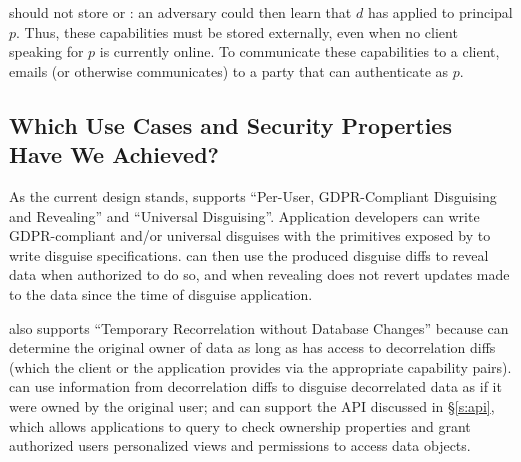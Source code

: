 \sys should not store  or : an adversary could then
learn that $d$ has applied to principal $p$. Thus, these capabilities must be stored externally,
even when no client speaking for $p$ is currently online.
%
%
To communicate these capabilities to a client,
\sys emails (or otherwise communicates)  to a party that can authenticate as $p$. 

\subsection{Which Use Cases and Security Properties Have We Achieved?}
As the current design stands, \sys supports ``Per-User, GDPR-Compliant Disguising and
Revealing'' and ``Universal Disguising''.
%
Application developers can write GDPR-compliant and/or universal disguises with the primitives
exposed by \sys to write disguise specifications.
%
\sys can then use the produced disguise diffs to reveal data when authorized to do so, and when
revealing does not revert updates made to the data since the time of disguise application.

%
\sys also supports ``Temporary Recorrelation without Database Changes'' because \sys can determine
the original owner of data as long as \sys has access to decorrelation diffs (which the client
or the application provides via the appropriate capability pairs).
%
\sys can use information from decorrelation diffs to disguise decorrelated data as if it were owned
by the original user; and 
%
\sys can support the API discussed in \S\ref{s:api}, which allows applications to query \sys to check
ownership properties and grant authorized users personalized views and permissions to access data objects.


